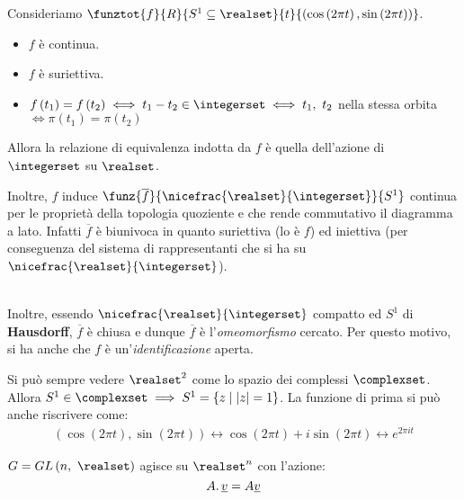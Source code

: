 \begin{demonstration}
Consideriamo $\funztot{f}{R}{S^1\subseteq \realset}{t}{\left(\cos\left(2\pi t\right),\sin\left(2\pi t\right)\right)}$.
\begin{itemize}
\item $f$ è continua.
\item $f$ è suriettiva.
\item $f\left(t_1\right)=f\left(t_2\right)\iff t_1-t_2\in \integerset \iff t_1,\ t_2$ nella stessa orbita$\iff \pi\left(t_1\right)=\pi\left(t_2\right)$
\end{itemize}
Allora la relazione di equivalenza indotta da $f$ è quella dell'azione di $\integerset$ su $\realset$.\\
\begin{minipage}[t]{0.83\textwidth}
 Inoltre, $f$ induce $\funz{\overline{f}}{\nicefrac{\realset}{\integerset}}{S^1}$ continua per le proprietà della topologia quoziente e che rende commutativo il diagramma a lato.
 Infatti $\overline{f}$ è biunivoca in quanto suriettiva (lo è $f$) ed iniettiva (per conseguenza del sistema di rappresentanti che si ha su $\nicefrac{\realset}{\integerset}$).
\end{minipage}
\begin{minipage}[t]{0.13\textwidth}\vspace{-10pt}
\end{minipage}\\
Inoltre, essendo $\nicefrac{\realset}{\integerset}$ compatto ed $S^1$ di \textbf{Hausdorff}, $\overline{f}$ è chiusa e dunque $\overline{f}$ è l'\textit{omeomorfismo} cercato. Per questo motivo, si ha anche che $f$ è un'\textit{identificazione} aperta.
\end{demonstration}
\begin{digression}
	Si può sempre vedere $\realset^2$ come lo spazio dei complessi $\complexset$. Allora $S^1\in \complexset\implies S^1=\left\{z\mid \lvert z\rvert=1\right\}$. La funzione di prima si può anche riscrivere come:
	\begin{gather}
		\left(\cos\left(2\pi t\right),\sin\left(2\pi t\right)\right)\leftrightarrow \cos\left(2\pi t\right)+i\sin\left(2\pi t\right)\leftrightarrow e^{2\pi i t}
	\end{gather}
	\vspace{-8mm}
\end{digression}
\begin{example}
$G=GL\left(n,\ \realset\right)$ agisce su $\realset^n$ con l'azione:
\begin{equation}
	A\ldotp \underline{v} = A\underline{v}
\end{equation}
\end{example}